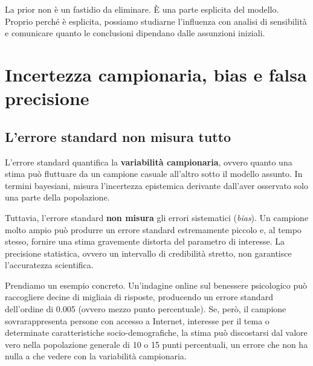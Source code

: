 \documentclass[
  italian,
  letterpaper,
  a4paper,
  11pt,
  open=any]{scrbook}
\theoremstyle{plain}
\theoremstyle{definition}
\theoremstyle{definition}
\theoremstyle{remark}
\begin{document}
\begin{tcolorbox}[enhanced jigsaw, arc=.35mm, bottomrule=.15mm, bottomtitle=1mm, breakable, colback=white, colbacktitle=quarto-callout-important-color!10!white, colframe=quarto-callout-important-color-frame, coltitle=black, left=2mm, leftrule=.75mm, opacityback=0, opacitybacktitle=0.6, rightrule=.15mm, title=\textcolor{quarto-callout-important-color}{\faExclamation}\hspace{0.5em}{Una buona pratica bayesiana}, titlerule=0mm, toprule=.15mm, toptitle=1mm]

La prior non è un fastidio da eliminare. È una parte esplicita del
modello. Proprio perché è esplicita, possiamo studiarne l'influenza con
analisi di sensibilità e comunicare quanto le conclusioni dipendano
dalle assunzioni iniziali.

\end{tcolorbox}

\section{Incertezza campionaria, bias e falsa
precisione}\label{sec-bias-false-precision}

\subsection{L'errore standard non misura
tutto}\label{lerrore-standard-non-misura-tutto}

L'errore standard quantifica la \textbf{variabilità campionaria}, ovvero
quanto una stima può fluttuare da un campione casuale all'altro sotto il
modello assunto. In termini bayesiani, misura l'incertezza epistemica
derivante dall'aver osservato solo una parte della popolazione.

Tuttavia, l'errore standard \textbf{non misura} gli errori sistematici
(\emph{bias}). Un campione molto ampio può produrre un errore standard
estremamente piccolo e, al tempo stesso, fornire una stima gravemente
distorta del parametro di interesse. La precisione statistica, ovvero un
intervallo di credibilità stretto, non garantisce l'accuratezza
scientifica.

Prendiamo un esempio concreto. Un'indagine online sul benessere
psicologico può raccogliere decine di migliaia di risposte, producendo
un errore standard dell'ordine di 0.005 (ovvero mezzo punto
percentuale). Se, però, il campione sovrarappresenta persone con accesso
a Internet, interesse per il tema o determinate caratteristiche
socio-demografiche, la stima può discostarsi dal valore vero nella
popolazione generale di 10 o 15 punti percentuali, un errore che non ha
nulla a che vedere con la variabilità campionaria.
\end{document}
